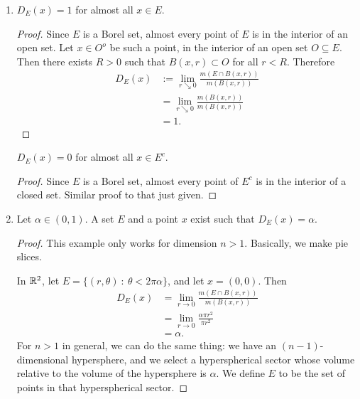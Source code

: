 \begin{enumerate}[label=(\alph*)]
\item
  \begin{claim*}
    $D_E(x) = 1$ for almost all $x \in E$.
  \end{claim*}

  \begin{proof}
    Since $E$ is a Borel set, almost every point of $E$ is in the interior of an open set. Let $x \in O^o$ be
    such a point, in the interior of an open set $O \subseteq E$. Then there exists $R > 0$ such
    that $B(x, r) \subset O$ for all $r < R$. Therefore
    \begin{align*}
      D_E(x)
      &:= \lim_{r \searrow 0} \frac{m(E \cap B(x, r))}{m(B(x, r))} \\
      &= \lim_{r \searrow 0} \frac{m(B(x, r))}{m(B(x, r))} \\
      &= 1.
    \end{align*}
  \end{proof}

  \begin{claim*}
    $D_E(x) = 0$ for almost all $x \in E^c$.
  \end{claim*}

  \begin{proof}
    Since $E$ is a Borel set, almost every point of $E^c$ is in the interior of a closed set. Similar proof to
    that just given.
  \end{proof}

\item
  \begin{claim*}
    Let $\alpha \in (0, 1)$. A set $E$ and a point $x$ exist such that $D_E(x) = \alpha$.
  \end{claim*}

  \begin{proof}
    This example only works for dimension $n > 1$. Basically, we make pie slices.

    In $\mathbb{R}^2$, let $E = \{(r, \theta) ~:~ \theta < 2\pi\alpha\}$, and let $x = (0, 0)$. Then
    \begin{align*}
      D_E(x)
      &= \lim_{r \to 0} \frac{m(E \cap B(x, r))}{m(B(x, r))} \\
      &= \lim_{r \to 0} \frac{\alpha\pi r^2}{\pi r^2} \\
      &= \alpha.
    \end{align*}
    For $n > 1$ in general, we can do the same thing: we have an $(n-1)$-dimensional hypersphere, and we select
    a hyperspherical sector whose volume relative to the volume of the hypersphere is $\alpha$. We define $E$
    to be the set of points in that hyperspherical sector.
  \end{proof}


\end{enumerate}
